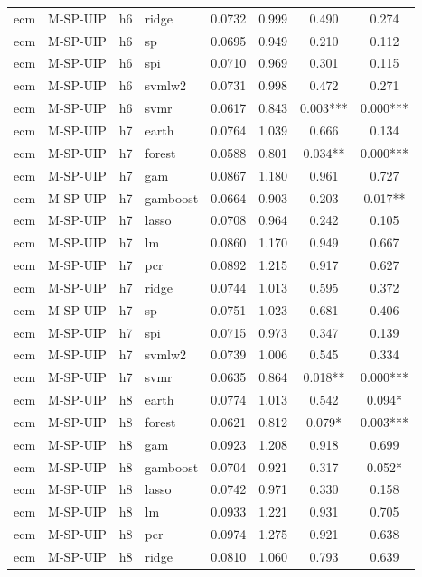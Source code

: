 \begin{ThreePartTable}
\begin{longtable}[t]{llclcccc}
ecm & M-SP-UIP & h6 & ridge & 0.0732 & 0.999 & 0.490 & 0.274\\
ecm & M-SP-UIP & h6 & sp & 0.0695 & 0.949 & 0.210 & 0.112\\
ecm & M-SP-UIP & h6 & spi & 0.0710 & 0.969 & 0.301 & 0.115\\
ecm & M-SP-UIP & h6 & svmlw2 & 0.0731 & 0.998 & 0.472 & 0.271\\
ecm & M-SP-UIP & h6 & svmr & 0.0617 & 0.843 & 0.003*** & 0.000***\\
\addlinespace
ecm & M-SP-UIP & h7 & earth & 0.0764 & 1.039 & 0.666 & 0.134\\
ecm & M-SP-UIP & h7 & forest & 0.0588 & 0.801 & 0.034** & 0.000***\\
ecm & M-SP-UIP & h7 & gam & 0.0867 & 1.180 & 0.961 & 0.727\\
ecm & M-SP-UIP & h7 & gamboost & 0.0664 & 0.903 & 0.203 & 0.017**\\
ecm & M-SP-UIP & h7 & lasso & 0.0708 & 0.964 & 0.242 & 0.105\\
ecm & M-SP-UIP & h7 & lm & 0.0860 & 1.170 & 0.949 & 0.667\\
ecm & M-SP-UIP & h7 & pcr & 0.0892 & 1.215 & 0.917 & 0.627\\
ecm & M-SP-UIP & h7 & ridge & 0.0744 & 1.013 & 0.595 & 0.372\\
ecm & M-SP-UIP & h7 & sp & 0.0751 & 1.023 & 0.681 & 0.406\\
ecm & M-SP-UIP & h7 & spi & 0.0715 & 0.973 & 0.347 & 0.139\\
ecm & M-SP-UIP & h7 & svmlw2 & 0.0739 & 1.006 & 0.545 & 0.334\\
ecm & M-SP-UIP & h7 & svmr & 0.0635 & 0.864 & 0.018** & 0.000***\\
\addlinespace
ecm & M-SP-UIP & h8 & earth & 0.0774 & 1.013 & 0.542 & 0.094*\\
ecm & M-SP-UIP & h8 & forest & 0.0621 & 0.812 & 0.079* & 0.003***\\
ecm & M-SP-UIP & h8 & gam & 0.0923 & 1.208 & 0.918 & 0.699\\
ecm & M-SP-UIP & h8 & gamboost & 0.0704 & 0.921 & 0.317 & 0.052*\\
ecm & M-SP-UIP & h8 & lasso & 0.0742 & 0.971 & 0.330 & 0.158\\
ecm & M-SP-UIP & h8 & lm & 0.0933 & 1.221 & 0.931 & 0.705\\
ecm & M-SP-UIP & h8 & pcr & 0.0974 & 1.275 & 0.921 & 0.638\\
ecm & M-SP-UIP & h8 & ridge & 0.0810 & 1.060 & 0.793 & 0.639\\

\end{longtable}
\end{ThreePartTable}
